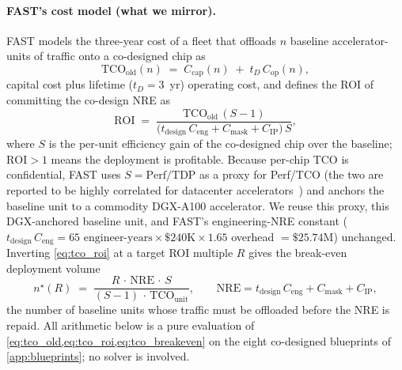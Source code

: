 \paragraph{FAST's cost model (what we mirror).}
FAST models the three-year cost of a fleet that offloads $n$ baseline
accelerator-units of traffic onto a co-designed chip as
%
\begin{equation}
\label{eq:tco_old}
\mathrm{TCO}_{\mathrm{old}}(n) \;=\; C_{\mathrm{cap}}(n) \;+\; t_D\, C_{\mathrm{op}}(n),
\end{equation}
%
capital cost plus lifetime ($t_D=3$~yr) operating cost, and defines the ROI of
committing the co-design NRE as
%
\begin{equation}
\label{eq:tco_roi}
\mathrm{ROI} \;=\; \frac{\mathrm{TCO}_{\mathrm{old}}\,(S-1)}
{\bigl(t_{\mathrm{design}}\,C_{\mathrm{eng}} + C_{\mathrm{mask}} + C_{\mathrm{IP}}\bigr)\,S},
\end{equation}
%
where $S$ is the per-unit efficiency gain of the co-designed chip over the
baseline; $\mathrm{ROI}>1$ means the deployment is profitable. Because per-chip
TCO is confidential, FAST uses $S=\text{Perf/TDP}$ as a proxy for Perf/TCO (the
two are reported to be highly correlated for datacenter
accelerators~\citep{jouppi2017datacenter,jouppi2021ten}) and anchors the
baseline unit to a commodity DGX-A100 accelerator. We reuse this proxy, this
DGX-anchored baseline unit, and FAST's engineering-NRE constant
($t_{\mathrm{design}}\,C_{\mathrm{eng}}=\text{65 engineer-years}\times\$240\mathrm{K}\times1.65$
overhead $=\$25.74\mathrm{M}$) unchanged. Inverting \cref{eq:tco_roi} at a
target ROI multiple $R$ gives the break-even deployment volume
%
\begin{equation}
\label{eq:tco_breakeven}
n^\star(R) \;=\; \frac{R\,\cdot\,\mathrm{NRE}\,\cdot\,S}{(S-1)\,\cdot\,\mathrm{TCO}_{\mathrm{unit}}},
\qquad
\mathrm{NRE} = t_{\mathrm{design}}\,C_{\mathrm{eng}} + C_{\mathrm{mask}} + C_{\mathrm{IP}},
\end{equation}
%
the number of baseline units whose traffic must be offloaded before the NRE is
repaid. All arithmetic below is a pure evaluation of
\cref{eq:tco_old,eq:tco_roi,eq:tco_breakeven} on the eight co-designed
blueprints of \cref{app:blueprints}; no solver is involved.

